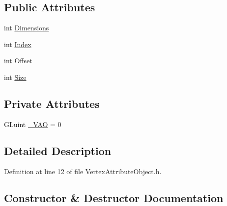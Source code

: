 \subsection*{Public Attributes}
\begin{DoxyCompactItemize}
\item 
int \mbox{\hyperlink{classEngine_1_1Components_1_1Objects_1_1VertexAttributeObject_aa440859216dad8d94b7a56d4d105fadf}{Dimensions}}
\item 
int \mbox{\hyperlink{classEngine_1_1Components_1_1Objects_1_1VertexAttributeObject_a854d40f88b9c4cd8e57be7a3d3f72e39}{Index}}
\item 
int \mbox{\hyperlink{classEngine_1_1Components_1_1Objects_1_1VertexAttributeObject_a2eadc0a67482dfff8bc65d91e2e974b9}{Offset}}
\item 
int \mbox{\hyperlink{classEngine_1_1Components_1_1Objects_1_1VertexAttributeObject_aadad45ab6562ea5054b5ce9761c1f2d1}{Size}}
\end{DoxyCompactItemize}
\subsection*{Private Attributes}
\begin{DoxyCompactItemize}
\item 
G\+Luint \mbox{\hyperlink{classEngine_1_1Components_1_1Objects_1_1VertexAttributeObject_a66edf6b8734008170901528cb3b07802}{\+\_\+\+V\+AO}} = 0
\end{DoxyCompactItemize}


\subsection{Detailed Description}


Definition at line 12 of file Vertex\+Attribute\+Object.\+h.



\subsection{Constructor \& Destructor Documentation}
\mbox{\label{classEngine_1_1Components_1_1Objects_1_1VertexAttributeObject_a1439a87dfc4f350a31e97a40a5cc1c3d}} 
